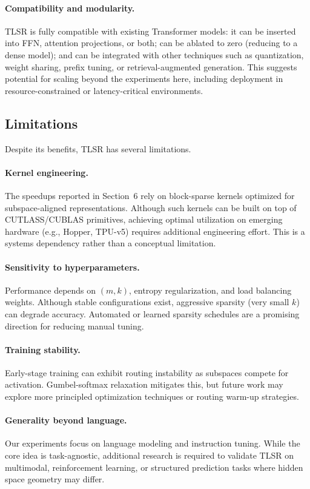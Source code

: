 \documentclass{article}
\theoremstyle{plain}
\theoremstyle{definition}
\theoremstyle{remark}
\begin{document}
\paragraph{Compatibility and modularity.}
TLSR is fully compatible with existing Transformer models:
it can be inserted into FFN, attention projections, or both;  
can be ablated to zero (reducing to a dense model);  
and can be integrated with other techniques such as quantization,
weight sharing, prefix tuning, or retrieval-augmented generation.
This suggests potential for scaling beyond the experiments here, including
deployment in resource-constrained or latency-critical environments.

\subsection{Limitations}

Despite its benefits, TLSR has several limitations.

\paragraph{Kernel engineering.}
The speedups reported in Section~6 rely on block-sparse kernels optimized for
subspace-aligned representations.
Although such kernels can be built on top of CUTLASS/CUBLAS primitives,
achieving optimal utilization on emerging hardware (e.g., Hopper, TPU-v5)
requires additional engineering effort.
This is a systems dependency rather than a conceptual limitation.

\paragraph{Sensitivity to hyperparameters.}
Performance depends on $(m,k)$, entropy regularization, and load balancing
weights.
Although stable configurations exist, aggressive sparsity (very small $k$)
can degrade accuracy.
Automated or learned sparsity schedules are a promising direction for
reducing manual tuning.

\paragraph{Training stability.}
Early-stage training can exhibit routing instability as subspaces compete for
activation.
Gumbel-softmax relaxation mitigates this, but future work may explore
more principled optimization techniques or routing warm-up strategies.

\paragraph{Generality beyond language.}
Our experiments focus on language modeling and instruction tuning.
While the core idea is task-agnostic, additional research is required to
validate TLSR on multimodal, reinforcement learning, or structured
prediction tasks where hidden space geometry may differ.
\end{document}

